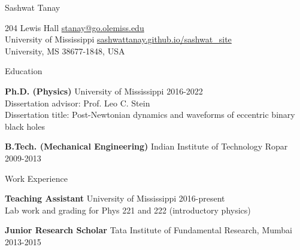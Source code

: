 \documentclass{resume} %
\begin{document}
  


  
  
\begin{center}
    {\huge Sashwat Tanay} \\ 
\end{center}



204 Lewis Hall   \hfill  \href{stanay@go.olemiss.edu}{stanay@go.olemiss.edu} \\
University of Mississippi   \hfill  \href{https://sashwattanay.github.io/sashwat_site}{sashwattanay.github.io/sashwat\_site}\\
University, MS 38677-1848, USA



\begin{rSection}{Education}


{\bf Ph.D. (Physics) } University of Mississippi \hfill {2016-2022}  \\
Dissertation advisor: Prof. Leo C. Stein  \\
Dissertation title: Post-Newtonian dynamics and waveforms of eccentric binary black holes 

{\bf B.Tech. (Mechanical Engineering) } Indian Institute of Technology Ropar \hfill {2009-2013}  \\

\end{rSection}



  

\begin{rSection}{Work Experience}

{\bf Teaching Assistant } University of Mississippi \hfill 2016-present  \\
\hspace*{1cm} Lab work and grading for Phys 221 and 222 (introductory physics) 


{\bf Junior Research Scholar} Tata Institute of Fundamental Research, Mumbai \hfill 2013-2015 


\end{rSection}
  
\end{document}
